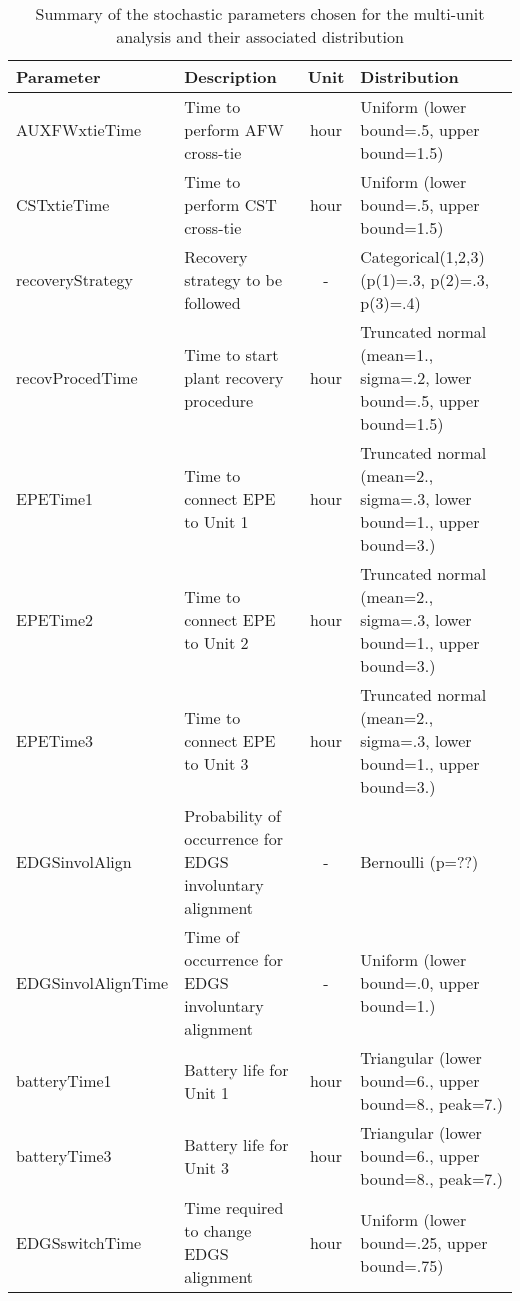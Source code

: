 \begin{table}
  \centering
  \begin{center}
      \begin{tabular}{ | l | p{5cm} | c | p{5cm} |}
        \hline
         \textbf{Parameter}          & \textbf{Description}                      & \textbf{Unit}   & \textbf{Distribution}                                         \\ \hline \hline
         AUXFWxtieTime      & Time to perform AFW cross-tie    & hour   & Uniform (lower bound=.5, upper bound=1.5)            \\ \hline
         CSTxtieTime        & Time to perform CST cross-tie    & hour   & Uniform (lower bound=.5, upper bound=1.5)            \\ \hline
         recoveryStrategy   & Recovery strategy to be followed & -      & Categorical(1,2,3) (p(1)=.3, p(2)=.3, p(3)=.4)       \\ \hline
         recovProcedTime    & Time to start plant recovery procedure    & hour        & Truncated normal (mean=1., sigma=.2, lower bound=.5, upper bound=1.5)       \\ \hline
         EPETime1           & Time to connect EPE to Unit 1    & hour   & Truncated normal (mean=2., sigma=.3, lower bound=1., upper bound=3.)   \\ \hline
         EPETime2           & Time to connect EPE to Unit 2    & hour   & Truncated normal (mean=2., sigma=.3, lower bound=1., upper bound=3.)   \\ \hline
         EPETime3           & Time to connect EPE to Unit 3    & hour   & Truncated normal (mean=2., sigma=.3, lower bound=1., upper bound=3.)   \\ \hline
         EDGSinvolAlign     & Probability of occurrence for EDGS involuntary alignment & -      & Bernoulli (p=??)                               \\ \hline
         EDGSinvolAlignTime & Time of occurrence for EDGS involuntary alignment        & -      & Uniform (lower bound=.0, upper bound=1.)       \\ \hline
         batteryTime1       & Battery life for Unit 1          & hour      & Triangular (lower bound=6., upper bound=8., peak=7.) \\ \hline
         batteryTime3       & Battery life for Unit 3          & hour      & Triangular (lower bound=6., upper bound=8., peak=7.) \\ \hline
         EDGSswitchTime     & Time required to change EDGS alignment       & hour  & Uniform (lower bound=.25, upper bound=.75)                  \\ 
        \hline
      \end{tabular}
  \end{center}
  \caption{Summary of the stochastic parameters chosen for the multi-unit analysis and their associated distribution}
  \label{tab:stochasticParameters1}
\end{table}

